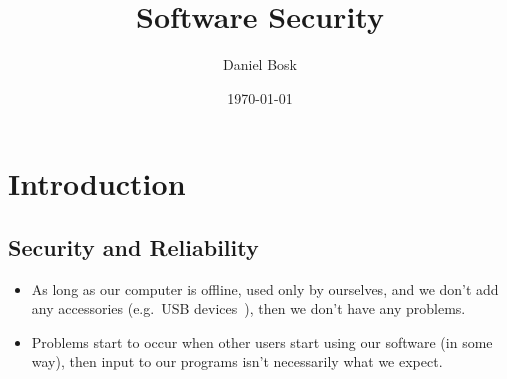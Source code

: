 \title{%
  Software Security
}
\author{%
  Daniel Bosk
}
\date{\today}


\mode*

\begin{abstract}
  
\end{abstract}




\section{Introduction}

\subsection{Security and Reliability}

\begin{frame}
  \begin{remark}
    \begin{itemize}
      \item As long as our computer is offline, used only by ourselves, and we 
        don't add any accessories (e.g.\ USB devices~\cite{ieeespectrum2014usb}), 
        then we don't have any problems.

        \pause

      \item Problems start to occur when other users start using our software (in 
        some way), then input to our programs isn't necessarily what we expect.

    \end{itemize}
  \end{remark}
\end{frame}

